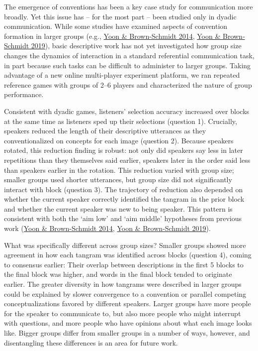 \documentclass[
  english,
  a4paper,
]{article}
\begin{document}
The emergence of conventions has been a key case study for communication more broadly. Yet this issue has -- for the most part -- been studied only in dyadic communication. While some studies have examined aspects of convention formation in larger groups (e.g., \protect\hyperlink{ref-yoonAdjustingConceptualPacts2014}{Yoon \& Brown-Schmidt 2014}, \protect\hyperlink{ref-yoonAudienceDesignMultiparty2019}{Yoon \& Brown‐Schmidt 2019}), basic descriptive work has not yet investigated how group size changes the dynamics of interaction in a standard referential communication task, in part because such tasks can be difficult to administer to larger groups. Taking advantage of a new online multi-player experiment platform, we ran repeated reference games with groups of 2--6 players and characterized the nature of group performance.

Consistent with dyadic games, listeners' selection accuracy increased over blocks at the same time as listeners sped up their selections (question 1).
Crucially, speakers reduced the length of their descriptive utterances as they conventionalized on concepts for each image (question 2). Because speakers rotated, this reduction finding is robust: not only did speakers say less in later repetitions than they themselves said earlier, speakers later in the order said less than speakers earlier in the rotation. This reduction varied with group size; smaller groups used shorter utterances, but group size did not significantly interact with block (question 3). The trajectory of reduction also depended on whether the current speaker correctly identified the tangram in the prior block and whether the current speaker was new to being speaker. This pattern is consistent with both the `aim low' and `aim middle' hypotheses from previous work (\protect\hyperlink{ref-yoonAdjustingConceptualPacts2014}{Yoon \& Brown-Schmidt 2014}, \protect\hyperlink{ref-yoonAudienceDesignMultiparty2019}{Yoon \& Brown‐Schmidt 2019}).

What was specifically different across group sizes? Smaller groups showed more agreement in how each tangram was identified across blocks (question 4), coming to consensus earlier: Their overlap between descriptions in the first 5 blocks to the final block was higher, and words in the final block tended to originate earlier. The greater diversity in how tangrams were described in larger groups could be explained by slower convergence to a convention or parallel competing conceptualizations favored by different speakers. Larger groups have more people for the speaker to communicate to, but also more people who might interrupt with questions, and more people who have opinions about what each image looks like. Bigger groups differ from smaller groups in a number of ways, however, and disentangling these differences is an area for future work.
\end{document}
